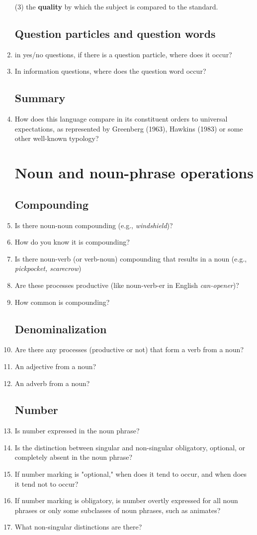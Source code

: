 \documentclass[twocolumn]{scrartcl}
\begin{document}
\begin{enumerate}[resume]
{ (3) the \textbf{quality} by which the subject is compared to the standard.}\label{compdef}
 \subsection{Question particles and question words}
 \item in yes/no questions, if there is a question particle, where does it occur?
 \item In information questions, where does the question word occur?
 \subsection{Summary}
 \item How does this language compare in its constituent orders to universal expectations, as represented by Greenberg (1963), Hawkins (1983) or some other well-known typology?
 \section{Noun and noun-phrase operations}
 \subsection{Compounding}
 \item Is there noun-noun compounding (e.g., \textit{windshield})?
 \item How do you know it is compounding?
 \item Is there noun-verb (or verb-noun) compounding that results in a noun (e.g., \textit{pickpocket, scarecrow})
 \item Are these processes productive (like noun-verb-er in English \textit{can-opener})?
 \item How common is compounding?
 \subsection{Denominalization}
 \item Are there any processes (productive or not) that form a verb from a noun?
 \item An adjective from a noun?
 \item An adverb from a noun?
 \subsection{Number}
 \item Is number expressed in the noun phrase?
 \item Is the distinction between singular and non-singular obligatory, optional, or completely absent in the noun phrase?
 \item If number marking is "optional," when does it tend to occur, and when does it tend not to occur?
 \item If number marking is obligatory, is number overtly expressed for all noun phrases or only some subclasses of noun phrases, such as animates?
 \item What non-singular distinctions are there?

\end{enumerate}
\end{document}
